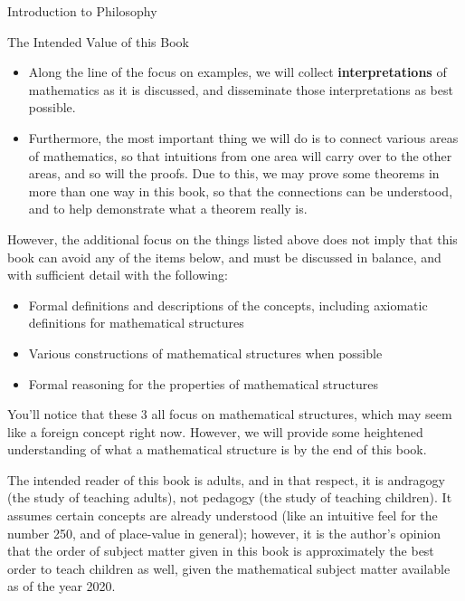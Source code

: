 \begin{chapter}{Introduction to Philosophy}
\begin{section}{The Intended Value of this Book}
\begin{itemize}
            \item Along the line of the focus on examples, we will collect \textbf{interpretations} of mathematics as it is discussed, and disseminate those interpretations as best possible.
                
            \item Furthermore, the most important thing we will do is to connect various areas of mathematics, so that intuitions from one area will carry over to the other areas, and so will the proofs. Due to this, we may prove some theorems in more than one way in this book, so that the connections can be understood, and to help demonstrate what a theorem really is.
        \end{itemize}
            
        However, the additional focus on the things listed above does not imply that this book can avoid any of the items below, and must be discussed in balance, and with sufficient detail with the following: 
            
        \begin{itemize}
            \setlength{\itemsep}{6pt}
            \setlength{\parskip}{12pt}
                
            \item Formal definitions and descriptions of the concepts, including axiomatic definitions for mathematical structures
                
            \item Various constructions of mathematical structures when possible
                
            \item Formal reasoning for the properties of mathematical structures
        \end{itemize}
            
        You'll notice that these 3 all focus on mathematical structures, which may seem like a foreign concept right now. However, we will provide some heightened understanding of what a mathematical structure is by the end of this book.
            
        The intended reader of this book is adults, and in that respect, it is andragogy (the study of teaching adults), not pedagogy (the study of teaching children). It assumes certain concepts are already understood (like an intuitive feel for the number 250, and of place-value in general); however, it is the author's opinion that the order of subject matter given in this book is approximately the best order to teach children as well, given the mathematical subject matter available as of the year 2020.
    \end{section}
        

\end{chapter}
